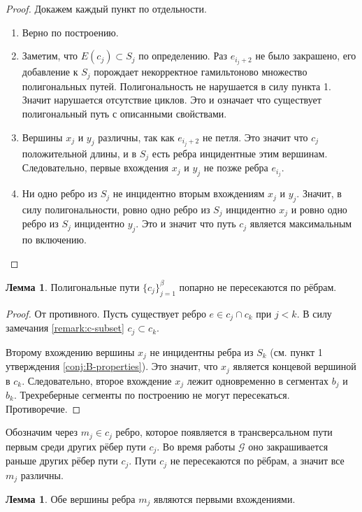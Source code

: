 \documentclass{article}
\theoremstyle{definition}
\newtheorem{lemma}[theorem]{Лемма}
\newcommand{\G}{\mathcal{G}}
\begin{document}
\begin{proof}
    Докажем каждый пункт по отдельности.
    \begin{enumerate}
        \item Верно по построению.
        \item Заметим, что $E(c_j) \subset S_j$ по определению. Раз $e_{i_j + 2}$ не было закрашено, его добавление к $S_j$ порождает некорректное гамильтоново множество полигональных путей. Полигональность не нарушается в силу пункта 1. Значит нарушается отсутствие циклов. Это и означает что существует полигональный путь с описанными свойствами. 
        \item  Вершины $x_j$ и $y_j$ различны, так как $e_{i_j + 2}$ не петля. Это значит что $c_j$ положительной длины, и в $S_j$ есть ребра инцидентные этим вершинам. Следовательно, первые вхождения $x_j$ и $y_j$ не позже ребра $e_{i_j}$.
        \item Ни одно ребро из $S_j$ не инцидентно вторым вхождениям $x_j$ и $y_j$. Значит, в силу полигональности, ровно одно ребро из $S_j$ инцидентно $x_j$ и ровно одно ребро из $S_j$ инцидентно $y_j$. Это и значит что путь $c_j$ является максимальным по включению.
    \end{enumerate}
\end{proof}

\begin{lemma}\label{lemma:disjoint-c}
    Полигональные пути $\{c_j\}_{j = 1}^\beta$ попарно не пересекаются по рёбрам.
\end{lemma}

\begin{proof}
    От противного. Пусть существует ребро $e \in c_j \cap c_k$ при $j < k$. В силу замечания \ref{remark:c-subset} $c_j \subset c_k$. 

    Второму вхождению вершины $x_j$ не инцидентны ребра из $S_k$ (см. пункт 1 утверждения \ref{conj:B-properties}). Это значит, что $x_j$ является концевой вершиной в $c_k$. Следовательно, второе вхождение $x_j$ лежит одновременно в сегментах $b_j$ и $b_k$. Трехреберные сегменты по построению не могут пересекаться. Противоречие.
\end{proof}

Обозначим через $m_j \in c_j$ ребро, которое появляется в трансверсальном пути первым среди других рёбер пути $c_j$. Во время работы $\G$ оно закрашивается раньше других рёбер пути $c_j$. Пути $c_j$ не пересекаются по рёбрам, а значит все $m_j$ различны.

\begin{lemma}
    Обе вершины ребра $m_j$ являются первыми вхождениями.
\end{lemma}
\end{document}
